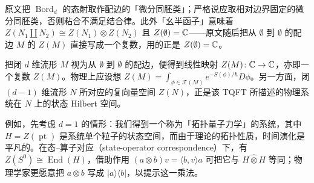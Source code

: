 \begin{yizhu}
原文把 $\operatorname{Bord}_d$ 的态射取作配边的「微分同胚类」；严格说应取相对边界固定的微分同胚类，否则粘合不满足结合律。此外「幺半函子」意味着 $Z(N_1\amalg N_2)\cong Z(N_1)\otimes Z(N_2)$ 且 $Z(\emptyset)=\mathbb{C}$——原文随后把从 $\emptyset$ 到 $\emptyset$ 的配边 $M$ 的 $Z(M)$ 直接写成一个复数，用的正是 $Z(\emptyset)=\mathbb{C}$。
\end{yizhu}

把闭 $d$ 维流形 $M$ 视为从 $\emptyset$ 到 $\emptyset$ 的配边，便得到线性映射 $Z(M) \colon \mathbb{C}  \to \mathbb{C} $，亦即一个复数 $Z(M)$。物理上应设想 $Z(M)=\int_{\phi \in \mathcal{F}(M)} e^{ - S(\phi)/ \hbar  } D \phi $。另一方面，闭 $(d-1)$ 维流形 $N$ 所对应的复向量空间 $Z(N)$，正是该 TQFT 所描述的物理系统在 $N$ 上的状态 Hilbert 空间。

例如，先考虑 $d=1$ 的情形：我们得到一个称为「拓扑量子力学」的系统，其中 $H=Z(\operatorname{pt})$ 是系统单个粒子的状态空间，而由于理论的拓扑性质，时间演化是平凡的。在态–算子对应（state-operator correspondence）下，有 $Z(S^0)\cong \operatorname{End}(H)$，借助作用 $(a\otimes b)v=\langle b,v\rangle a$ 可把它与 $H\hat{\otimes}H$ 等同；物理学家更愿意把 $a\otimes b$ 写成 $|a\rangle\langle b|$，以提示这一乘法。

